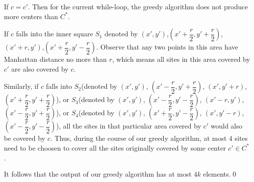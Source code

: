 \documentclass[10pt]{article}
\begin{document}
\begin{itemize}
	\item If $c = c'$. Then for the current while-loop, the greedy algorithm does not produce more centers than $C^*$.
	{\color{red}
	\item If $c$ falls into the inner square $S_1$ denoted by $(x',y')$,$(x'+ \dfrac{r}{2}, y' + \dfrac{r}{2})$,$(x' + r, y')$,$(x' + \dfrac{r}{2}, y' - \dfrac{r}{2})$. Observe that any two points in this area have Manhattan distance no more than $r$, which means all sites in this area covered by $c'$ are also covered by $c$.
	\item Similarly, if $c$ falls into $S_2$(denoted by $(x',y')$, $(x' - \dfrac{r}{2}, y' + \dfrac{r}{2})$, $(x', y' + r)$, $(x'+ \dfrac{r}{2}, y' + \dfrac{r}{2})$), or $S_3$(denoted by $(x',y')$, $(x' - \dfrac{r}{2}, y' - \dfrac{r}{2})$, $(x' - r, y')$, $(x'- \dfrac{r}{2}, y' + \dfrac{r}{2})$), or $S_4$(denoted by $(x',y')$, $(x' + \dfrac{r}{2}, y' - \dfrac{r}{2})$, $(x', y' - r)$, $(x'- \dfrac{r}{2}, y' - \dfrac{r}{2})$), all the sites in that particular area covered by $c'$ would also be covered by $c$. Thus, during the course of our greedy algorithm, at most $4$ sites need to be choosen to cover all the sites originally covered by some center $c' \in C^*$. 
	}
\end{itemize}
It follows that the output of our greedy algorithm has at most $4k$ elements.\qed
\end{document}
